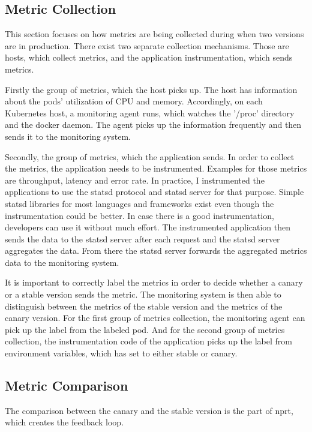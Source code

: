 \subsection{Metric Collection}

This section focuses on how metrics are being collected during when two versions are in
production. There exist two separate collection mechanisms. Those are hosts, which collect
metrics, and the application instrumentation, which sends metrics.

Firstly the group of metrics, which the host picks up. The host has information about the
pods' utilization of CPU and memory. Accordingly, on each Kubernetes host, a monitoring
agent runs, which watches the '/proc' directory and the docker daemon. The agent picks up
the information frequently and then sends it to the monitoring system.

Secondly, the group of metrics, which the application sends. In order to collect the
metrics, the application needs to be instrumented. Examples for those metrics are
throughput, latency and error rate. In practice, I instrumented the applications to use the
statsd protocol and statsd server for that purpose. Simple statsd libraries for most
languages and frameworks exist even though the instrumentation could be better. In case
there is a good instrumentation, developers can use it without much effort. The
instrumented application then sends the data to the statsd server after each request and
the statsd server aggregates the data. From there the statsd server forwards the
aggregated metrics data to the monitoring system.

It is important to correctly label the metrics in order to decide whether a canary or a
stable version sends the metric. The monitoring system is then able to distinguish between
the metrics of the stable version and the metrics of the canary version. For the first
group of metrics collection, the monitoring agent can pick up the label from the labeled
pod. And for the second group of metrics collection, the instrumentation code of the
application picks up the label from environment variables, which \deployer has set to
either stable or canary.

\subsection{Metric Comparison}
\label{sec:metric_comparison}

The comparison between the canary and the stable version is the part of \gls{nprt}, which
creates the feedback loop.

